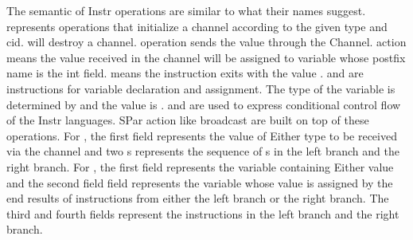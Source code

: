 The semantic of Instr operations are similar to what their names suggest.  represents operations that initialize a channel according to the given type and cid.  will destroy a channel.  operation sends the value  through the Channel.  action means the value received in the channel will be assigned to variable whose postfix name is the int field.  means the instruction exits with the value .  and  are instructions for variable declaration and assignment. The type of the variable is determined by  and the value is .  and  are used to express conditional control flow of the Instr languages. SPar action like broadcast are built on top of these operations. For , the first field represents the value of Either type to be received via the channel and two s represents the sequence of s in the left branch and the right branch. For , the first field represents the variable containing Either value and the second field field represents the variable whose value is assigned by the end results of instructions from either the left branch or the right branch. The third and fourth fields represent the instructions in the left branch and the right branch.

